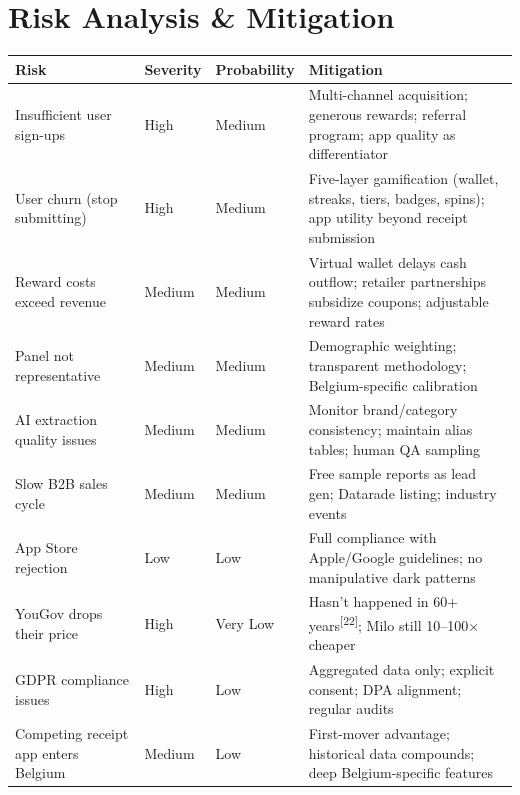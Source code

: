 \documentclass[11pt,a4paper]{article}
\begin{document}
\clearpage

\section{Risk Analysis \& Mitigation}

\begin{center}
\renewcommand{\arraystretch}{1.4}
\begin{tabularx}{\textwidth}{L{3.5cm} C{1.5cm} C{1.5cm} L{6.5cm}}
\toprule
{}
\textbf{\color{white}Risk} & \textbf{\color{white}Severity} & \textbf{\color{white}Probability} & \textbf{\color{white}Mitigation} \\
\midrule
Insufficient user sign-ups & High & Medium & Multi-channel acquisition; generous rewards; referral program; app quality as differentiator \\
User churn (stop submitting) & High & Medium & Five-layer gamification (wallet, streaks, tiers, badges, spins); app utility beyond receipt submission \\
Reward costs exceed revenue & Medium & Medium & Virtual wallet delays cash outflow; retailer partnerships subsidize coupons; adjustable reward rates \\
Panel not representative & Medium & Medium & Demographic weighting; transparent methodology; Belgium-specific calibration \\
AI extraction quality issues & Medium & Medium & Monitor brand/category consistency; maintain alias tables; human QA sampling \\
Slow B2B sales cycle & Medium & Medium & Free sample reports as lead gen; Datarade listing; industry events \\
App Store rejection & Low & Low & Full compliance with Apple/Google guidelines; no manipulative dark patterns \\
YouGov drops their price & High & Very Low & Hasn't happened in 60+ years\textsuperscript{[22]}; Milo still 10--100$\times$ cheaper \\
GDPR compliance issues & High & Low & Aggregated data only; explicit consent; DPA alignment; regular audits \\
Competing receipt app enters Belgium & Medium & Low & First-mover advantage; historical data compounds; deep Belgium-specific features \\
\bottomrule
\end{tabularx}
\end{center}
\end{document}
